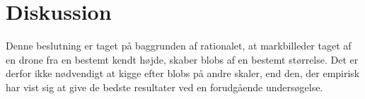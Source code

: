 \section{Diskussion}


Denne beslutning er taget på baggrunden af rationalet, at markbilleder taget af en drone fra en bestemt kendt højde, skaber blobs af en bestemt størrelse. Det er derfor ikke nødvendigt at kigge efter blobs på andre skaler, end den, der empirisk har vist sig at give de bedste resultater  ved en forudgående undersøgelse.



